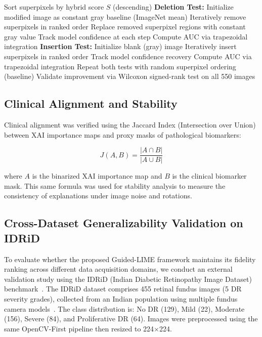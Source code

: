 \documentclass[10pt,twoside]{article}
\begin{document}
\begin{algorithm}[ht]
\caption{Quantitative Fidelity Evaluation}\label{alg:fidelity}
\begin{algorithmic}[1]
\State Sort superpixels by hybrid score $S$ (descending)
\State \textbf{Deletion Test:}
\State \quad Initialize modified image as constant gray baseline (ImageNet mean)
\State \quad Iteratively remove superpixels in ranked order
\State \quad Replace removed superpixel regions with constant gray value
\State \quad Track model confidence at each step
\State \quad Compute AUC via trapezoidal integration
\State \textbf{Insertion Test:}
\State \quad Initialize blank (gray) image
\State \quad Iteratively insert superpixels in ranked order
\State \quad Track model confidence recovery
\State \quad Compute AUC via trapezoidal integration
\State Repeat both tests with random superpixel ordering (baseline)
\State Validate improvement via Wilcoxon signed-rank test on all 550 images
\end{algorithmic}
\end{algorithm}

\subsection{Clinical Alignment and Stability}

Clinical alignment was verified using the Jaccard Index (Intersection over Union) between XAI importance maps and proxy masks of pathological biomarkers:

\begin{equation}
\label{eq:jaccard}
J(A, B) = \frac{|A \cap B|}{|A \cup B|}
\end{equation}

\noindent where $A$ is the binarized XAI importance map and $B$ is the clinical biomarker mask. This same formula was used for stability analysis to measure the consistency of explanations under image noise and rotations.

\subsection{Cross-Dataset Generalizability Validation on IDRiD}

To evaluate whether the proposed Guided-LIME framework maintains its fidelity ranking across different data acquisition domains, we conduct an external validation study using the IDRiD (Indian Diabetic Retinopathy Image Dataset) benchmark~\cite{porwal2018idrid}. The IDRiD dataset comprises 455 retinal fundus images (5 DR severity grades), collected from an Indian population using multiple fundus camera models~\cite{porwal2018idrid}. The class distribution is: No DR (129), Mild (22), Moderate (156), Severe (84), and Proliferative DR (64). Images were preprocessed using the same OpenCV-First pipeline then resized to 224$\times$224.
\end{document}
